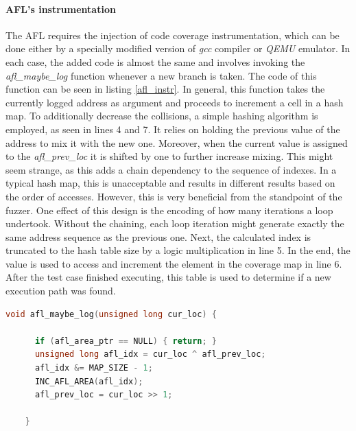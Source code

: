 \paragraph{AFL's instrumentation}
The AFL requires the injection of code coverage instrumentation, which can be done either by a specially modified version of \textit{gcc} compiler or \textit{QEMU} emulator. In each case, the added code is almost the same and involves invoking the \textit{afl\_maybe\_log} function whenever a new branch is taken. The code of this function can be seen in listing \ref{afl_instr}. In general, this function takes the currently logged address as argument and proceeds to increment a cell in a hash map. To additionally decrease the collisions, a simple hashing algorithm is employed, as seen in lines 4 and 7. It relies on holding the previous value of the address to mix it with the new one. Moreover, when the current value is assigned to the \textit{afl\_prev\_loc} it is shifted by one to further increase mixing. This might seem strange, as this adds a chain dependency to the sequence of indexes. In a typical hash map, this is unacceptable and results in different results based on the order of accesses. However, this is very beneficial from the standpoint of the fuzzer. One effect of this design is the encoding of how many iterations a loop undertook. Without the chaining, each loop iteration might generate exactly the same address sequence as the previous one. Next, the calculated index is truncated to the hash table size by a logic multiplication in line 5. In the end, the value is used to access and increment the element in the coverage map in line 6. After the test case finished executing, this table is used to determine if a new execution path was found.

\begin{minipage}\linewidth
    \begin{lstlisting}[language=C,caption={Instrumentation code from AFLPlusPlus fuzzer from \cite{aflpprepo}.},captionpos=b,label={afl_instr}]
    void afl_maybe_log(unsigned long cur_loc) {
    
      if (afl_area_ptr == NULL) { return; }
      unsigned long afl_idx = cur_loc ^ afl_prev_loc;
      afl_idx &= MAP_SIZE - 1;
      INC_AFL_AREA(afl_idx);
      afl_prev_loc = cur_loc >> 1;
    
    }
    \end{lstlisting}
\end{minipage}

